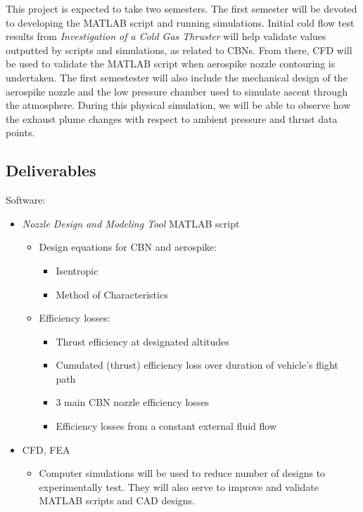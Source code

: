 \documentclass[conference]{IEEEtran} %
\begin{document}
	This project is expected to take two semesters. The first semester will be devoted to developing the MATLAB script and running simulations. Initial cold flow test results from \textit{Investigation of a Cold Gas Thruster} will help validate values outputted by scripts and simulations, as related to CBNs. From there, CFD will be used to validate the MATLAB script when aerospike nozzle contouring is undertaken. The first semestester will also include the mechanical design of the aerospike nozzle and the low pressure chamber used to simulate ascent through the atmosphere. During this physical simulation, we will be able to observe how the exhaust plume changes with respect to ambient pressure and thrust data points.
	
	\subsection{Deliverables}
	\label{subsec:deliverables}
	Software:
	\begin{itemize}
		\item \textit{Nozzle Design and Modeling Tool} MATLAB script
		\begin{itemize}
			\item  Design equations for CBN and aerospike:
			\begin{itemize}
				\item Isentropic
				\item Method of Characteristics
			\end{itemize}
			\item  Efficiency losses:
			\begin{itemize}
				\item Thrust efficiency at designated altitudes
				\item Cumulated (thrust) efficiency loss over duration of vehicle's flight path
				\item 3 main CBN nozzle efficiency losses
				\item Efficiency losses from a constant external fluid flow
			\end{itemize}
		\end{itemize}
		\item CFD, FEA
		\begin{itemize}
			\item Computer simulations will be used to reduce number of designs to experimentally test. They will also serve to improve and validate MATLAB scripts and CAD designs.
		\end{itemize}
	\end{itemize}
\end{document}
